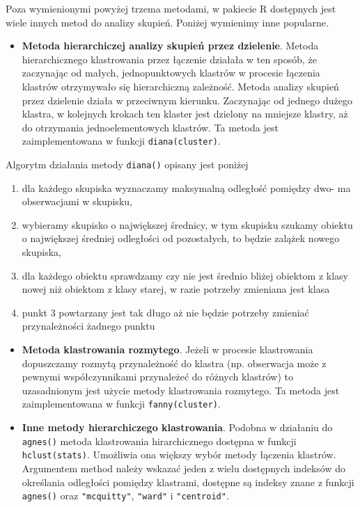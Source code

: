 \documentclass[polish,]{book}
\providecommand{\tightlist}{%
  \setlength{\itemsep}{0pt}\setlength{\parskip}{0pt}}
\begin{document}
Poza wymienionymi powyżej trzema metodami, w pakiecie R dostępnych jest wiele
innych metod do analizy skupień. Poniżej wymienimy inne popularne.

\begin{itemize}
\tightlist
\item
  \textbf{Metoda hierarchiczej analizy skupień przez dzielenie}. Metoda hierarchicznego klastrowania przez łączenie działała w ten sposób, że zaczynając
  od małych, jednopunktowych klastrów w procesie łączenia klastrów otrzymywało się hierarchiczną zależność. Metoda analizy skupień przez dzielenie
  działa w przeciwnym kierunku. Zaczynając od jednego dużego klastra, w kolejnych krokach ten klaster jest dzielony na mniejsze klastry, aż do otrzymania jednoelementowych klastrów. Ta metoda jest zaimplementowana w funkcji
  \texttt{diana(cluster)}.
\end{itemize}

Algorytm działania metody \texttt{diana()} opisany jest poniżej

\begin{enumerate}
\def\labelenumi{\arabic{enumi}.}
\item
  dla każdego skupiska wyznaczamy maksymalną odległość pomiędzy dwo-
  ma obserwacjami w skupisku,
\item
  wybieramy skupisko o największej średnicy, w tym skupisku szukamy
  obiektu o największej średniej odległości od pozostałych, to będzie zalążek nowego skupiska,
\item
  dla każdego obiektu sprawdzamy czy nie jest średnio bliżej obiektom z
  klasy nowej niż obiektom z klasy starej, w razie potrzeby zmieniana jest
  klasa
\item
  punkt 3 powtarzany jest tak długo aż nie będzie potrzeby zmieniać przynależności żadnego punktu
\end{enumerate}

\begin{itemize}
\item
  \textbf{Metoda klastrowania rozmytego}. Jeżeli w procesie klastrowania dopuszczamy rozmytą przynależność do klastra (np. obserwacja może z pewnymi
  współczynnikami przynależeć do różnych klastrów) to uzasadnionym jest użycie metody klastrowania rozmytego. Ta metoda jest zaimplementowana w funkcji \texttt{fanny(cluster)}.
\item
  \textbf{Inne metody hierarchiczego klastrowania}. Podobna w działaniu do
  \texttt{agnes()} metoda klastrowania hirarchicznego dostępna w funkcji \texttt{hclust(stats)}.
  Umożliwia ona większy wybór metody łączenia klastrów. Argumentem method
  należy wskazać jeden z wielu dostępnych indeksów do określania odległości pomiędzy klastrami, dostępne są indeksy znane z funkcji \texttt{agnes()} oraz \texttt{"mcquitty"},
  \texttt{"ward"} i \texttt{"centroid"}.
\end{itemize}
\end{document}
